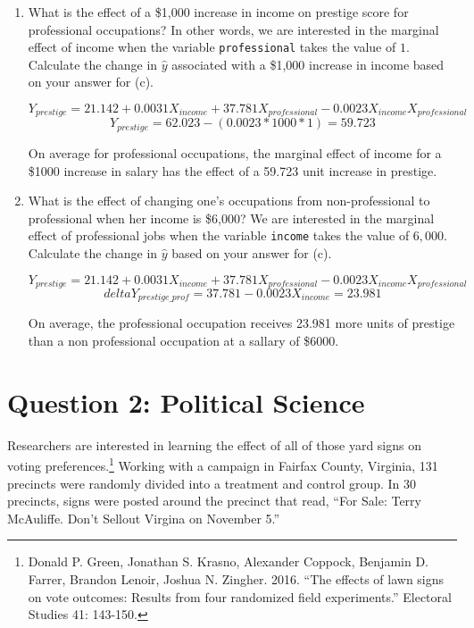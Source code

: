 \documentclass[12pt,letterpaper]{article}
\begin{document}
\begin{enumerate}
	\newpage
	\item [(f)]
	What is the effect of a \$1,000 increase in income on prestige score for professional occupations? In other words, we are interested in the marginal effect of income when the variable \texttt{professional} takes the value of $1$. Calculate the change in $\hat{y}$ associated with a \$1,000 increase in income based on your answer for (c).
	
	\vspace{.5cm}
	$$
	Y_{prestige} = 21.142  + 0.0031X_{income} + 37.781X_{professional} - 0.0023X_{income}X_{professional}	
	$$
	$$
	Y_{prestige} = 62.023 - (0.0023 * 1000 * 1) =  59.723
	$$
	
	On average for professional occupations, the marginal effect of income for a \$1000 increase in salary has the effect of a 59.723 unit increase in prestige. 
	
	\item [(g)]
	What is the effect of changing one's occupations from non-professional to professional when her income is \$6,000? We are interested in the marginal effect of professional jobs when the variable \texttt{income} takes the value of $6,000$. Calculate the change in $\hat{y}$ based on your answer for (c).
	
	$$
	Y_{prestige} = 21.142  + 0.0031X_{income} + 37.781X_{professional} - 0.0023X_{income}X_{professional}	
	$$
	$$
	{delta}Y_{prestige\_prof} =37.781 -0.0023X_{income}  = 23.981
	$$
	
On average,	the professional occupation receives 23.981 more units of prestige than a non professional occupation at a sallary of \$6000.
	
\end{enumerate}

\newpage

\section*{Question 2: Political Science}
\vspace{.25cm}
\noindent 	Researchers are interested in learning the effect of all of those yard signs on voting preferences.\footnote{Donald P. Green, Jonathan	S. Krasno, Alexander Coppock, Benjamin D. Farrer,	Brandon Lenoir, Joshua N. Zingher. 2016. ``The effects of lawn signs on vote outcomes: Results from four randomized field experiments.'' Electoral Studies 41: 143-150. } Working with a campaign in Fairfax County, Virginia, 131 precincts were randomly divided into a treatment and control group. In 30 precincts, signs were posted around the precinct that read, ``For Sale: Terry McAuliffe. Don't Sellout Virgina on November 5.'' \\
\end{document}
